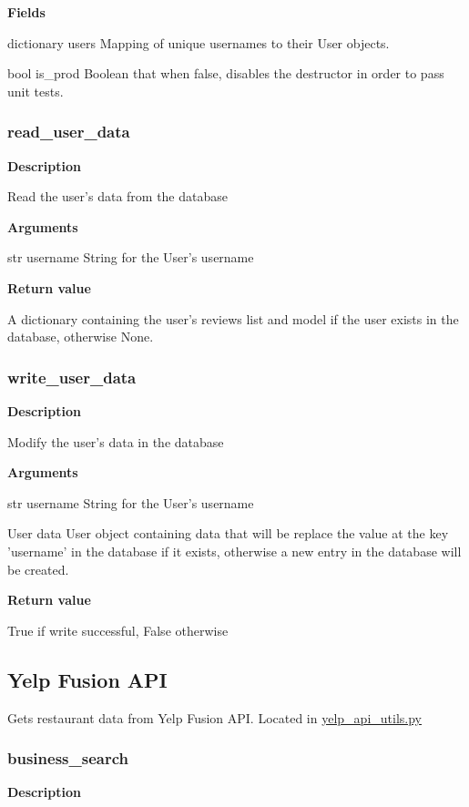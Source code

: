 \documentclass[11pt]{article}
\begin{document}
\textbf{Fields}
\begin{deflist}
	\item[dictionary users] Mapping of unique usernames to their User objects.
	\item[bool is\_prod] Boolean that when false, disables the destructor in order to pass unit tests.
\end{deflist}

\subsubsection{read\_user\_data}
\textbf{Description}

Read the user's data from the database

\textbf{Arguments}
\begin{deflist}
	\item[str username] String for the User's username
\end{deflist}

\textbf{Return value}

A dictionary containing the user's reviews list and model if the user exists in the database, otherwise None.

\subsubsection{write\_user\_data}
\textbf{Description}

Modify the user's data in the database

\textbf{Arguments}
\begin{deflist}
	\item[str username] String for the User's username
	\item[User data] User object containing data that will be replace the value at the key 'username' in the database if it exists, otherwise a new entry in the database will be created.
\end{deflist}

\textbf{Return value}

True if write successful, False otherwise

\subsection{Yelp Fusion API}
Gets restaurant data from Yelp Fusion API. Located in \url{yelp\_api\_utils.py}

\subsubsection{business\_search}
\textbf{Description}
\end{document}
